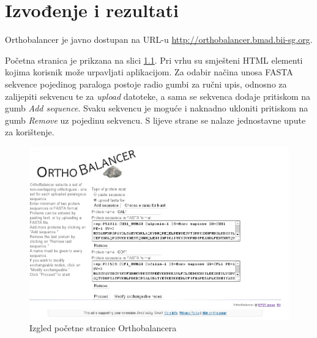 \chapter{Izvođenje i rezultati}
\label{chap:rezultati}

Orthobalancer je javno dostupan na URL-u
\footnotesize{\url{http://orthobalancer.bmad.bii-sg.org}}.


Početna stranica je prikzana na slici \ref{fig:input-html}. Pri vrhu su
smješteni HTML elementi kojima korisnik može urpavljati aplikacijom. Za odabir
načina unosa FASTA sekvence pojedinog paraloga postoje radio gumbi  za ručni upis, odnosno za zalijepiti sekvencu  te
za \emph{upload} datoteke, a sama se sekvenca dodaje pritiskom na gumb \emph{Add
sequence}. Svaku sekvencu je moguće i naknadno ukloniti pritiskom na gumb
\emph{Remove} uz pojedinu sekvencu. S lijeve strane se nalaze jednostavne upute
za korištenje.

\begin{figure}[h!]
\centering
\includegraphics[width=5.8in]{figures/input-html.png}
\caption{Izgled početne stranice Orthobalancera}
\label{fig:input-html}
\end{figure} 

